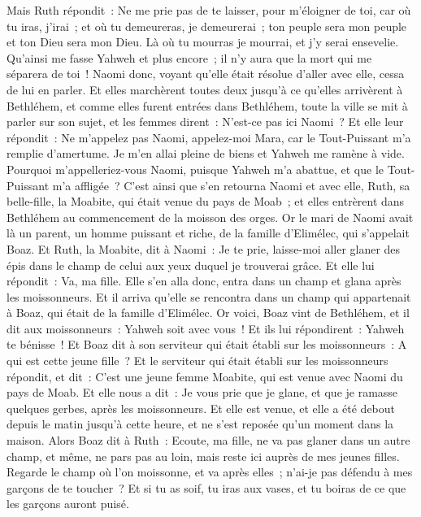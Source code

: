 \begin{multicols}{2}
Mais Ruth répondit~: Ne me prie pas de te laisser, pour m'éloigner de toi, car où tu iras, j'irai~; et où tu demeureras, je demeurerai~; ton peuple sera mon peuple et ton Dieu sera mon Dieu.
Là où tu mourras je mourrai, et j'y serai ensevelie. Qu'ainsi me fasse Yahweh et plus encore~; il n'y aura que la mort qui me séparera de toi~!
Naomi donc, voyant qu'elle était résolue d'aller avec elle, cessa de lui en parler.
Et elles marchèrent toutes deux jusqu'à ce qu'elles arrivèrent à Bethléhem, et comme elles furent entrées dans Bethléhem, toute la ville se mit à parler sur son sujet, et les femmes dirent~: N'est-ce pas ici Naomi~?
Et elle leur répondit~: Ne m'appelez pas Naomi, appelez-moi Mara, car le Tout-Puissant m'a remplie d'amertume.
Je m'en allai pleine de biens et Yahweh me ramène à vide. Pourquoi m'appelleriez-vous Naomi, puisque Yahweh m'a abattue, et que le Tout-Puissant m'a affligée~?
C'est ainsi que s'en retourna Naomi et avec elle, Ruth, sa belle-fille, la Moabite, qui était venue du pays de Moab~; et elles entrèrent dans Bethléhem au commencement de la moisson des orges.
\VerseOne{}Or le mari de Naomi avait là un parent, un homme puissant et riche, de la famille d'Elimélec, qui s'appelait Boaz.
Et Ruth, la Moabite, dit à Naomi~: Je te prie, laisse-moi aller glaner des épis dans le champ de celui aux yeux duquel je trouverai grâce. Et elle lui répondit~: Va, ma fille.
Elle s'en alla donc, entra dans un champ et glana après les moissonneurs. Et il arriva qu'elle se rencontra dans un champ qui appartenait à Boaz, qui était de la famille d'Elimélec.
Or voici, Boaz vint de Bethléhem, et il dit aux moissonneurs~: Yahweh soit avec vous~! Et ils lui répondirent~: Yahweh te bénisse~!
Et Boaz dit à son serviteur qui était établi sur les moissonneurs~: A qui est cette jeune fille~?
Et le serviteur qui était établi sur les moissonneurs répondit, et dit~: C'est une jeune femme Moabite, qui est venue avec Naomi du pays de Moab.
Et elle nous a dit~: Je vous prie que je glane, et que je ramasse quelques gerbes, après les moissonneurs. Et elle est venue, et elle a été debout depuis le matin jusqu'à cette heure, et ne s'est reposée qu'un moment dans la maison.
Alors Boaz dit à Ruth~: Ecoute, ma fille, ne va pas glaner dans un autre champ, et même, ne pars pas au loin, mais reste ici auprès de mes jeunes filles.
Regarde le champ où l'on moissonne, et va après elles~; n'ai-je pas défendu à mes garçons de te toucher~? Et si tu as soif, tu iras aux vases, et tu boiras de ce que les garçons auront puisé.

\end{multicols}
